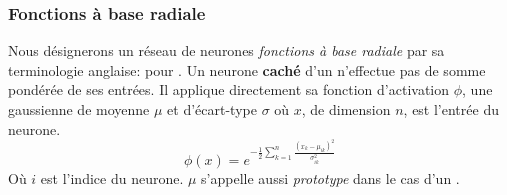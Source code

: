 \subsubsection{Fonctions à base radiale}
Nous désignerons un réseau de neurones \emph{fonctions à base radiale} par sa terminologie anglaise: \rbf pour .
\newcommand{\factnorm}{\sum_{r=1}^{m}x_{r}}
Un neurone \textbf{caché} d'un \rbf n'effectue pas de somme pondérée de ses entrées.
Il applique directement sa fonction d'activation $\phi$, une gaussienne de moyenne $\mu$ et d'écart-type $\sigma$ où $x$, de dimension $n$, est l'entrée du neurone.
\begin{equation}\label{eq:cachephi}
 \phi(x) = e^{-\frac{1}{2}\sum_{k=1}^{n}\frac{(x_k-\mu_{ik})^2}{\sigma_{ik}^{2}}}
\end{equation}
Où $i$ est l'indice du neurone. $\mu$ s'appelle aussi \emph{prototype} dans le cas d'un \rbf.
\\


